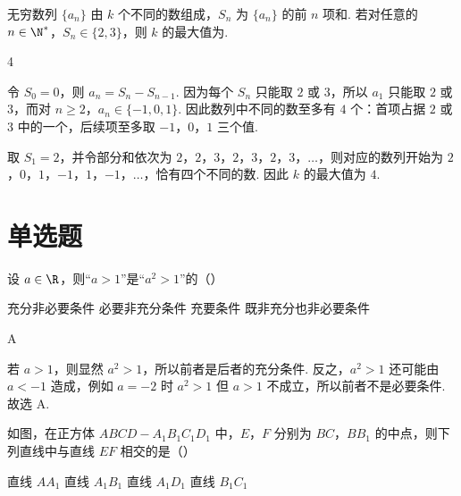 \begin{problem}
无穷数列 \(\{a_n\}\) 由 \(k\) 个不同的数组成，\(S_n\) 为 \(\{a_n\}\) 的前 \(n\) 项和. 若对任意的 \(n\in\N^*\)，\(S_n\in\{2,3\}\)，则 \(k\) 的最大值为\fillinblank{}.
\end{problem}

\begin{answer}
4
\end{answer}

\begin{solution}
令 \(S_0=0\)，则 \(a_n=S_n-S_{n-1}\). 因为每个 \(S_n\) 只能取 \(2\) 或 \(3\)，所以 \(a_1\) 只能取 \(2\) 或 \(3\)，而对 \(n\geqslant2\)，\(a_n\in\{-1,0,1\}\). 因此数列中不同的数至多有 \(4\) 个：首项占据 \(2\) 或 \(3\) 中的一个，后续项至多取 \(-1\)，\(0\)，\(1\) 三个值.

取 \(S_1=2\)，并令部分和依次为 \(2\)，\(2\)，\(3\)，\(2\)，\(3\)，\(2\)，\(3\)，\(\ldots\)，则对应的数列开始为 \(2\)，\(0\)，\(1\)，\(-1\)，\(1\)，\(-1\)，\(\ldots\)，恰有四个不同的数. 因此 \(k\) 的最大值为 \(4\).
\end{solution}

\section{单选题}

\begin{problem}
设 \(a\in\R\)，则“\(a>1\)”是“\(a^2>1\)”的（\quad）

\choices
    {充分非必要条件}
    {必要非充分条件}
    {充要条件}
    {既非充分也非必要条件}
\end{problem}

\begin{answer}
A
\end{answer}

\begin{solution}
若 \(a>1\)，则显然 \(a^2>1\)，所以前者是后者的充分条件. 反之，\(a^2>1\) 还可能由 \(a<-1\) 造成，例如 \(a=-2\) 时 \(a^2>1\) 但 \(a>1\) 不成立，所以前者不是必要条件. 故选 A.
\end{solution}

\begin{problem}
如图，在正方体 \(ABCD-A_1B_1C_1D_1\) 中，\(E\)，\(F\) 分别为 \(BC\)，\(BB_1\) 的中点，则下列直线中与直线 \(EF\) 相交的是（\quad）


\choices
    {直线 \(AA_1\)}
    {直线 \(A_1B_1\)}
    {直线 \(A_1D_1\)}
    {直线 \(B_1C_1\)}
\end{problem}

